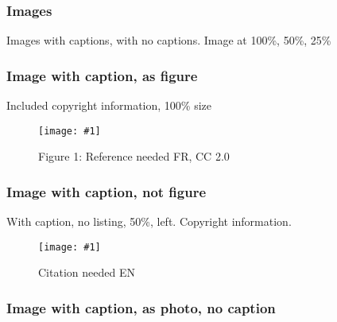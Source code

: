 \documentclass{article}
\newlength{\imgwidth}
\newcommand\scaledgraphics[2]{%
                
\settowidth{\imgwidth}{\texttt{[image: \#1]}}%
                
\setlength{\imgwidth}{\minof{\imgwidth}{#2\textwidth}}%
                
\texttt{[image: \#1]}%
                
}
\begin{document}
\subsubsection{Images}\label{H607067}



Images with captions, with no captions. Image at 100\%, 50\%, 25\%


\subsubsection{Image with caption, as figure}\label{H415836}



Included copyright information, 100\% size

\begin{figure}
\scaledgraphics{2112cd94-9504-4ac8-a467-c996ced73408.jpg}{1}
\caption*{Figure 1: Reference needed FR, CC 2.0}\label{F46521}
\end{figure}





\subsubsection{Image with caption, not figure}\label{H9577977}



With caption, no listing, 50\%, left. Copyright information.

\begin{wrapfigure}{l}{0.5\textwidth}
\scaledgraphics{d2133ec1-3584-435f-ae11-585197fe8785.jpg}{0.5}
\caption*{Citation needed EN}\label{F35988861}
\end{wrapfigure}

















\subsubsection{Image with caption, as photo, no caption}\label{H166321}
\end{document}
